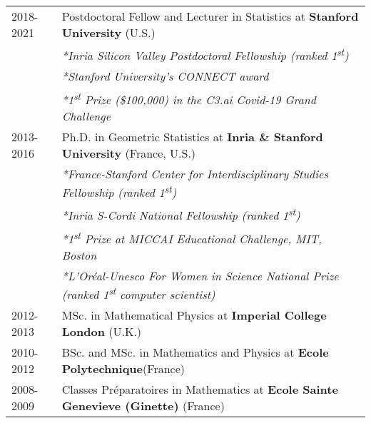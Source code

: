 \begin{tabularx}{\linewidth}{@{}l X@{}}	
2018-2021  & Postdoctoral Fellow and Lecturer in Statistics at \textbf{Stanford University} \hfill (U.S.)\\
& \textit{*Inria Silicon Valley Postdoctoral Fellowship (ranked 1\textsuperscript{st})}\\
& \textit{*Stanford University's CONNECT award}\\
& \textit{*1\textsuperscript{st} Prize (\$100,000) in the C3.ai Covid-19 Grand Challenge}\\

2013-2016  & Ph.D. in Geometric Statistics at \textbf{Inria \& Stanford University} \hfill (France, U.S.)\\
& \textit{*France-Stanford Center for Interdisciplinary Studies Fellowship (ranked 1\textsuperscript{st})}\\
& \textit{*Inria S-Cordi National Fellowship (ranked 1\textsuperscript{st})}\\
& \textit{*1\textsuperscript{st} Prize at MICCAI Educational Challenge, MIT, Boston}\\
& \textit{*L'Oréal-Unesco For Women in Science National Prize (ranked 1\textsuperscript{st} computer scientist)}\\


2012-2013  & MSc. in Mathematical Physics at \textbf{Imperial College London} \hfill  (U.K.)\\ 

2010-2012 & BSc. and MSc. in Mathematics and Physics at \textbf{Ecole Polytechnique}\hfill (France) \\

2008-2009 & Classes Préparatoires in Mathematics at \textbf{Ecole Sainte Genevieve (Ginette)} \hfill (France)\\
\end{tabularx}

